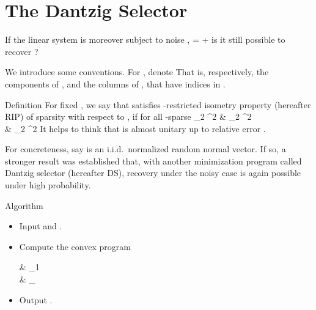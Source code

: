 \section {The Dantzig Selector}

If the linear system is moreover subject to noise ,
%
 {
=  +  
}
is it still possible to recover ?

We introduce some conventions.
For , denote
%
%
That is, respectively, the components of , and the columns of , that have indices in .

\Result
{Definition}
{
For fixed , we say that  satisfies -restricted isometry property (hereafter  RIP) of sparsity  with respect to , if for all -sparse 
%
 {
  _2 ^2
\leq & _2 ^2 \notag \\
%
\leq &  _2 ^2 
}
}
%
It helps to think that  is almost unitary up to relative error .

For concreteness, say  is an i.i.d.\ normalized random normal vector.
If so, a stronger result was established \cite {CaT07} that, with another  minimization program called Dantzig selector (hereafter DS), recovery under the noisy case is again possible under high probability.

\Result
{Algorithm}
{
\begin {itemize}
\item Input  and .
%
\item Compute the convex program
%
 {
\leftarrow \begin {cases}
 &  _1 \\
%
 \;  \quad &  _\infty \leq \g \\
\end {cases} 
}
\item Output .
\end {itemize}
}


